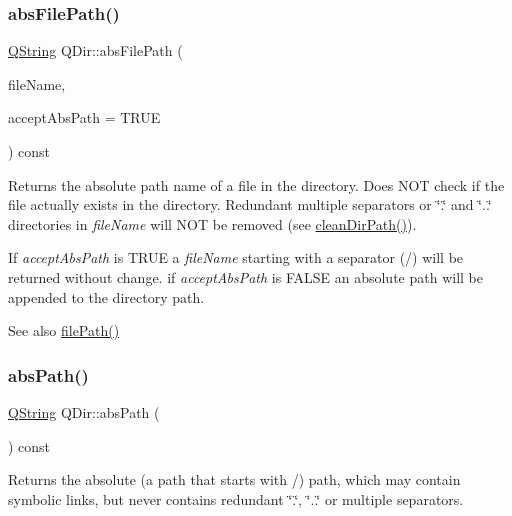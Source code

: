 \subsubsection{\texorpdfstring{absFilePath()}{absFilePath()}}
{\footnotesize\ttfamily \mbox{\hyperlink{class_q_string}{Q\+String}} Q\+Dir\+::abs\+File\+Path (\begin{DoxyParamCaption}\item[{const \mbox{\hyperlink{class_q_string}{Q\+String}} \&}]{file\+Name,  }\item[{bool}]{accept\+Abs\+Path = {\ttfamily TRUE} }\end{DoxyParamCaption}) const\hspace{0.3cm}{\ttfamily [virtual]}}

Returns the absolute path name of a file in the directory. Does N\+OT check if the file actually exists in the directory. Redundant multiple separators or \char`\"{}.\char`\"{} and \char`\"{}..\char`\"{} directories in {\itshape file\+Name} will N\+OT be removed (see \mbox{\hyperlink{class_q_dir_ad38037708dc754f5bdd877c145dbbb19}{clean\+Dir\+Path()}}).

If {\itshape accept\+Abs\+Path} is T\+R\+UE a {\itshape file\+Name} starting with a separator (\textquotesingle{}/\textquotesingle{}) will be returned without change. if {\itshape accept\+Abs\+Path} is F\+A\+L\+SE an absolute path will be appended to the directory path.

\begin{DoxySeeAlso}{See also}
\mbox{\hyperlink{class_q_dir_a5210a2a0b20d77d2d9ab29e7631310e6}{file\+Path()}} 
\end{DoxySeeAlso}
\mbox{\label{class_q_dir_a1464e556606a3223b8db1b3629c41cb7}} 
\subsubsection{\texorpdfstring{absPath()}{absPath()}}
{\footnotesize\ttfamily \mbox{\hyperlink{class_q_string}{Q\+String}} Q\+Dir\+::abs\+Path (\begin{DoxyParamCaption}{ }\end{DoxyParamCaption}) const\hspace{0.3cm}{\ttfamily [virtual]}}

Returns the absolute (a path that starts with \textquotesingle{}/\textquotesingle{}) path, which may contain symbolic links, but never contains redundant \char`\"{}.\char`\"{}, \char`\"{}..\char`\"{} or multiple separators.

